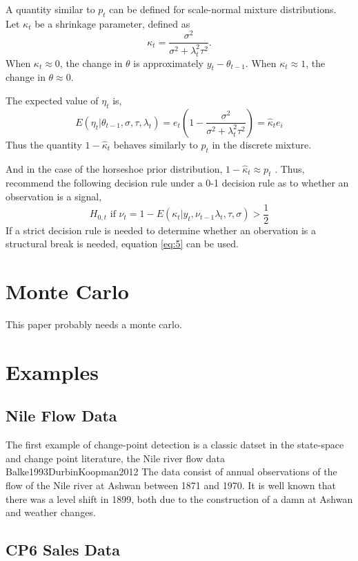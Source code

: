 \documentclass{article}
\begin{document}
A quantity similar to $p_{t}$ can be defined for scale-normal mixture distributions.
Let $\kappa_{t}$ be a shrinkage parameter, defined as
\begin{equation}
  \label{eq:3}
  \kappa_{t} = \frac{\sigma^{2}}{\sigma^{2} + \lambda^{2}_{t} \tau^{2}} \text{.}
\end{equation}
When $\kappa_{t} \approx 0$, the change in $\theta$ is approximately $y_{t} - \theta_{t-1}$.
When $\kappa_{t} \approx 1$, the change in $\theta \approx 0$.

The expected value of $\eta_{t}$ is,
\begin{equation}
  \label{eq:10}
  E(\eta_{t} | \theta_{t - 1}, \sigma, \tau, \lambda_{t}) = e_{t}
  \left(
    1 - \frac{\sigma^{2}}{\sigma^{2} + \lambda^{2}_{t} \tau^{2}}
  \right)  = \hat \kappa_{t} e_{i}
\end{equation}
Thus the quantity $1 - \hat \kappa_{t}$ behaves similarly to $p_{t}$ in the discrete mixture.

And in the case of the horseshoe prior distribution, $1 - \hat \kappa_{t} \approx p_{t}$ \parencite[474]{CarvalhoPolsonScott2010}.
Thus, \textcite{CarvalhoPolsonScott2010} recommend the following  decision rule under a 0-1 decision rule as to whether an observation is a signal,
\begin{equation}
  \label{eq:5}
  \text{$H_{0,t}$ if $\nu_{t} = 1 - E(\kappa_{t}|y_{t}, \nu_{t-1} \lambda_{t}, \tau, \sigma) > \frac{1}{2}$}
\end{equation}
If a strict decision rule is needed to determine whether an obervation is a structural break is needed, equation \eqref{eq:5} can be used.

\section{Monte Carlo}
\label{sec:monte-carlo}

This paper probably needs a monte carlo.

\section{Examples}
\label{sec:examples}

\subsection{Nile Flow Data}
\label{sec:nile}

The first example of change-point detection is a classic datset in the state-space and change point literature, the Nile river flow data \textcite{Cobb1978}{Balke1993}{DurbinKoopman2012}
The data consist of annual observations of the flow of the Nile river at Ashwan between 1871 and 1970. 
It is well known that there was a level shift in 1899, both due to the construction of a damn at Ashwan and weather changes.

\subsection{CP6 Sales Data}
\label{sec:cp6-sales-data}




\printbibliography{}
\end{document}

